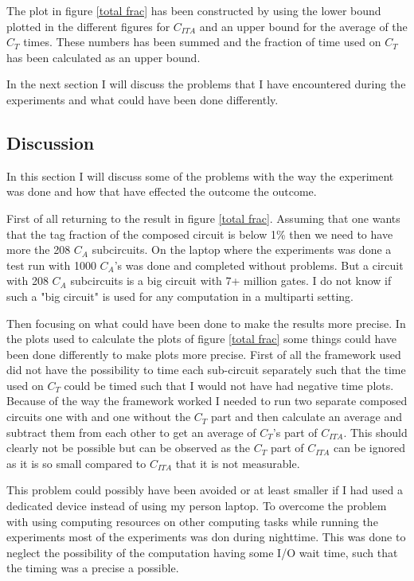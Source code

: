 \documentclass[10pt,a4paper]{article}
\begin{document}
The plot in figure \ref{total frac} has been constructed by using the lower bound plotted in the different figures for $C_{ITA}$ and an upper bound for the average of the $C_T$ times. These numbers has been summed and the fraction of time used on $C_T$ has been calculated as an upper bound.

In the next section I will discuss the problems that I have encountered during the experiments and what could have been done differently.

\subsection{Discussion}

In this section I will discuss some of the problems with the way the experiment was done and how that have effected the outcome the outcome.

First of all returning to the result in figure \ref{total frac}. Assuming that one wants that the tag fraction of the composed circuit is below 1\% then we need to have more the 208 $C_A$ subcircuits. On the laptop where the experiments was done a test run with 1000 $C_A$'s was done and completed without problems. But a circuit with 208 $C_A$ subcircuits is a big circuit with 7+ million gates. I do not know if such a "big circuit" is used for any computation in a multiparti setting.

\bigskip
Then focusing on what could have been done to make the results more precise.
In the plots used to calculate the plots of figure \ref{total frac} some things could have been done differently to make plots more precise. First of all the framework used did not have the possibility to time each sub-circuit separately such that the time used on $C_T$ could be timed such that I would not have had negative time plots. Because of the way the framework worked I needed to run two separate composed circuits one with and one without the $C_T$ part and then calculate an average and subtract them from each other to get an average of $C_T$'s part of $C_{ITA}$. This should clearly not be possible but can be observed as the $C_T$ part of $C_{ITA}$ can be ignored as it is so small compared to $C_{ITA}$ that it is not measurable. 

This problem could possibly have been avoided or at least smaller if I had used a dedicated device instead of using my person laptop. To overcome the problem with using computing resources on other computing tasks while running the experiments most of the experiments was don during nighttime. This was done to neglect the possibility of the computation having some I/O wait time, such that the timing was a precise a possible.
\end{document}
